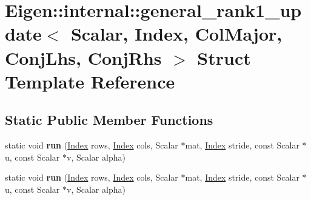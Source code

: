 \hypertarget{struct_eigen_1_1internal_1_1general__rank1__update_3_01_scalar_00_01_index_00_01_col_major_00_01_conj_lhs_00_01_conj_rhs_01_4}{}\section{Eigen\+:\+:internal\+:\+:general\+\_\+rank1\+\_\+update$<$ Scalar, Index, Col\+Major, Conj\+Lhs, Conj\+Rhs $>$ Struct Template Reference}
\label{struct_eigen_1_1internal_1_1general__rank1__update_3_01_scalar_00_01_index_00_01_col_major_00_01_conj_lhs_00_01_conj_rhs_01_4}
\subsection*{Static Public Member Functions}
\begin{DoxyCompactItemize}
\item 
\mbox{\label{struct_eigen_1_1internal_1_1general__rank1__update_3_01_scalar_00_01_index_00_01_col_major_00_01_conj_lhs_00_01_conj_rhs_01_4_a5c4b2875de31f48fcf5ec368d34f0500}} 
static void {\bfseries run} (\hyperlink{namespace_eigen_a62e77e0933482dafde8fe197d9a2cfde}{Index} rows, \hyperlink{namespace_eigen_a62e77e0933482dafde8fe197d9a2cfde}{Index} cols, Scalar $\ast$mat, \hyperlink{namespace_eigen_a62e77e0933482dafde8fe197d9a2cfde}{Index} stride, const Scalar $\ast$u, const Scalar $\ast$v, Scalar alpha)
\item 
\mbox{\label{struct_eigen_1_1internal_1_1general__rank1__update_3_01_scalar_00_01_index_00_01_col_major_00_01_conj_lhs_00_01_conj_rhs_01_4_a5c4b2875de31f48fcf5ec368d34f0500}} 
static void {\bfseries run} (\hyperlink{namespace_eigen_a62e77e0933482dafde8fe197d9a2cfde}{Index} rows, \hyperlink{namespace_eigen_a62e77e0933482dafde8fe197d9a2cfde}{Index} cols, Scalar $\ast$mat, \hyperlink{namespace_eigen_a62e77e0933482dafde8fe197d9a2cfde}{Index} stride, const Scalar $\ast$u, const Scalar $\ast$v, Scalar alpha)
\end{DoxyCompactItemize}


